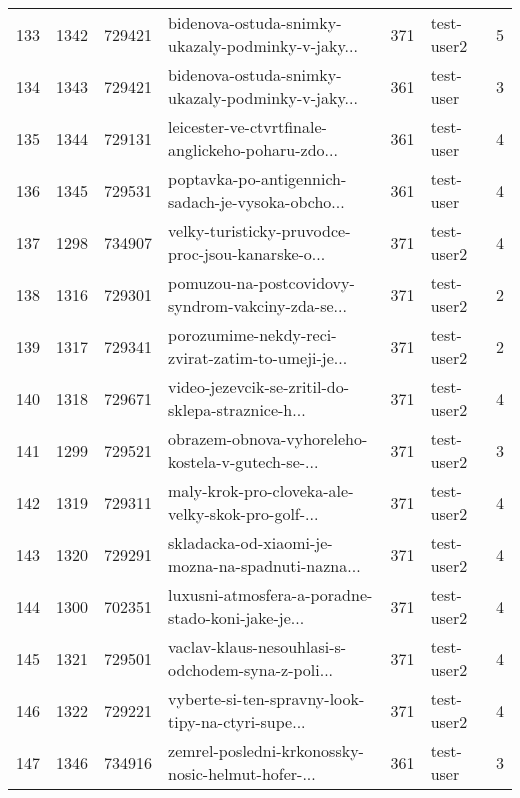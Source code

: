 \begin{tabular}{lrrlrlr}
133  &       1342 &   729421 &  bidenova-ostuda-snimky-ukazaly-podminky-v-jaky... &      371 &                   test-user2 &               5 \\
134  &       1343 &   729421 &  bidenova-ostuda-snimky-ukazaly-podminky-v-jaky... &      361 &                    test-user &               3 \\
135  &       1344 &   729131 &  leicester-ve-ctvrtfinale-anglickeho-poharu-zdo... &      361 &                    test-user &               4 \\
136  &       1345 &   729531 &  poptavka-po-antigennich-sadach-je-vysoka-obcho... &      361 &                    test-user &               4 \\
137  &       1298 &   734907 &  velky-turisticky-pruvodce-proc-jsou-kanarske-o... &      371 &                   test-user2 &               4 \\
138  &       1316 &   729301 &  pomuzou-na-postcovidovy-syndrom-vakciny-zda-se... &      371 &                   test-user2 &               2 \\
139  &       1317 &   729341 &  porozumime-nekdy-reci-zvirat-zatim-to-umeji-je... &      371 &                   test-user2 &               2 \\
140  &       1318 &   729671 &  video-jezevcik-se-zritil-do-sklepa-straznice-h... &      371 &                   test-user2 &               4 \\
141  &       1299 &   729521 &  obrazem-obnova-vyhoreleho-kostela-v-gutech-se-... &      371 &                   test-user2 &               3 \\
142  &       1319 &   729311 &  maly-krok-pro-cloveka-ale-velky-skok-pro-golf-... &      371 &                   test-user2 &               4 \\
143  &       1320 &   729291 &  skladacka-od-xiaomi-je-mozna-na-spadnuti-nazna... &      371 &                   test-user2 &               4 \\
144  &       1300 &   702351 &  luxusni-atmosfera-a-poradne-stado-koni-jake-je... &      371 &                   test-user2 &               4 \\
145  &       1321 &   729501 &  vaclav-klaus-nesouhlasi-s-odchodem-syna-z-poli... &      371 &                   test-user2 &               4 \\
146  &       1322 &   729221 &  vyberte-si-ten-spravny-look-tipy-na-ctyri-supe... &      371 &                   test-user2 &               4 \\
147  &       1346 &   734916 &  zemrel-posledni-krkonossky-nosic-helmut-hofer-... &      361 &                    test-user &               3 \\

\end{tabular}
